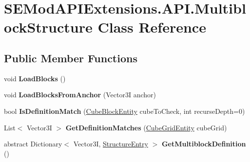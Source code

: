 \hypertarget{class_s_e_mod_a_p_i_extensions_1_1_a_p_i_1_1_multiblock_structure}{}\section{S\+E\+Mod\+A\+P\+I\+Extensions.\+A\+P\+I.\+Multiblock\+Structure Class Reference}
\label{class_s_e_mod_a_p_i_extensions_1_1_a_p_i_1_1_multiblock_structure}
\subsection*{Public Member Functions}
\begin{DoxyCompactItemize}
\item 
\hypertarget{class_s_e_mod_a_p_i_extensions_1_1_a_p_i_1_1_multiblock_structure_ab2d05618a1e41609a3672bb616f480a3}{}void {\bfseries Load\+Blocks} ()\label{class_s_e_mod_a_p_i_extensions_1_1_a_p_i_1_1_multiblock_structure_ab2d05618a1e41609a3672bb616f480a3}

\item 
\hypertarget{class_s_e_mod_a_p_i_extensions_1_1_a_p_i_1_1_multiblock_structure_a5df4de87d7845e6fa3cd3aa6b8609631}{}void {\bfseries Load\+Blocks\+From\+Anchor} (Vector3\+I anchor)\label{class_s_e_mod_a_p_i_extensions_1_1_a_p_i_1_1_multiblock_structure_a5df4de87d7845e6fa3cd3aa6b8609631}

\item 
\hypertarget{class_s_e_mod_a_p_i_extensions_1_1_a_p_i_1_1_multiblock_structure_a64c6c180ef4ff9b7b90481d91b9636d8}{}bool {\bfseries Is\+Definition\+Match} (\hyperlink{class_s_e_mod_a_p_i_internal_1_1_a_p_i_1_1_entity_1_1_sector_1_1_sector_object_1_1_cube_grid_1_1_cube_block_entity}{Cube\+Block\+Entity} cube\+To\+Check, int recurse\+Depth=0)\label{class_s_e_mod_a_p_i_extensions_1_1_a_p_i_1_1_multiblock_structure_a64c6c180ef4ff9b7b90481d91b9636d8}

\item 
\hypertarget{class_s_e_mod_a_p_i_extensions_1_1_a_p_i_1_1_multiblock_structure_ad5b89eff994432dd3396c427732aebfc}{}List$<$ Vector3\+I $>$ {\bfseries Get\+Definition\+Matches} (\hyperlink{class_s_e_mod_a_p_i_internal_1_1_a_p_i_1_1_entity_1_1_sector_1_1_sector_object_1_1_cube_grid_entity}{Cube\+Grid\+Entity} cube\+Grid)\label{class_s_e_mod_a_p_i_extensions_1_1_a_p_i_1_1_multiblock_structure_ad5b89eff994432dd3396c427732aebfc}

\item 
\hypertarget{class_s_e_mod_a_p_i_extensions_1_1_a_p_i_1_1_multiblock_structure_afeeea9ce19887f9776a135e228b602d2}{}abstract Dictionary$<$ Vector3\+I, \hyperlink{class_s_e_mod_a_p_i_extensions_1_1_a_p_i_1_1_structure_entry}{Structure\+Entry} $>$ {\bfseries Get\+Multiblock\+Definition} ()\label{class_s_e_mod_a_p_i_extensions_1_1_a_p_i_1_1_multiblock_structure_afeeea9ce19887f9776a135e228b602d2}

\end{DoxyCompactItemize}
